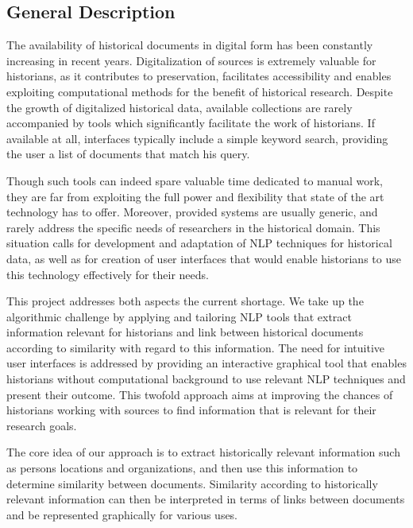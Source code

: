 

\subsection{General Description}
\label{sec:general_description}
The availability of historical documents in digital form has been constantly increasing in recent years. 
Digitalization of sources is extremely valuable for historians, as it contributes to preservation, facilitates 
accessibility and enables exploiting computational methods for the benefit of historical research. Despite the growth 
of digitalized historical data, available collections are rarely accompanied by tools which significantly facilitate the 
work of historians. If available at all,  interfaces typically include a simple keyword search, providing the user a list 
of documents that match his query. 

Though such tools can indeed spare valuable time dedicated to manual work, 
they are far from exploiting the full power and flexibility that state of the art technology has to offer. 
Moreover, provided systems are usually generic, and rarely address the specific needs of researchers in the historical domain. 
This situation calls for development and adaptation of NLP techniques for historical data, as well as for creation of user interfaces 
that would enable historians to use this technology effectively for their needs. 

This project addresses both aspects the current shortage. We take up the algorithmic challenge by applying and tailoring NLP tools 
that extract information relevant for historians and link between historical documents according to similarity with regard to this information.
The need for intuitive user interfaces is addressed by providing an interactive graphical tool that enables historians without 
computational background to use relevant NLP techniques and present their outcome. This twofold approach aims at improving the chances of 
historians working with sources to find information that is relevant for their research goals.

The core idea of our approach is to extract historically relevant information such as persons locations and organizations,
and then use this information to determine similarity between documents. Similarity according to historically relevant information
can then be interpreted in terms of links between documents and be represented graphically for various uses.

